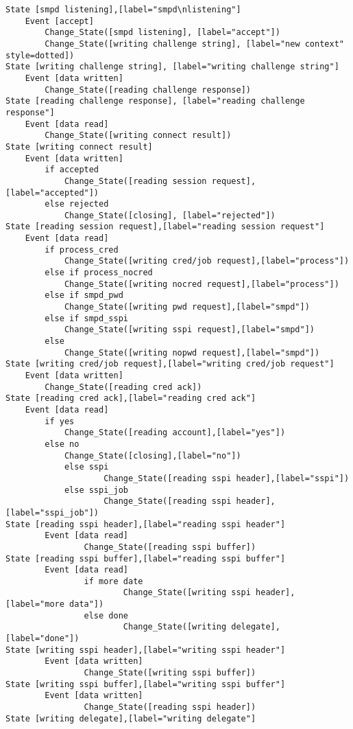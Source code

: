 \begin{comment}
This is the state machine for the smpd listener process.
Graph [smpd listener],
      [size="7.5, 10"]
\end{comment}
\begin{verbatim}
State [smpd listening],[label="smpd\nlistening"]
	Event [accept]
		Change_State([smpd listening], [label="accept"])
		Change_State([writing challenge string], [label="new context" style=dotted])
State [writing challenge string], [label="writing challenge string"]
	Event [data written]
		Change_State([reading challenge response])
State [reading challenge response], [label="reading challenge response"]
	Event [data read]
		Change_State([writing connect result])
State [writing connect result]
	Event [data written]
		if accepted
			Change_State([reading session request], [label="accepted"])
		else rejected
			Change_State([closing], [label="rejected"])
State [reading session request],[label="reading session request"]
	Event [data read]
		if process_cred
			Change_State([writing cred/job request],[label="process"])
		else if process_nocred
			Change_State([writing nocred request],[label="process"])
		else if smpd_pwd
			Change_State([writing pwd request],[label="smpd"])
		else if smpd_sspi
			Change_State([writing sspi request],[label="smpd"])
		else
			Change_State([writing nopwd request],[label="smpd"])
State [writing cred/job request],[label="writing cred/job request"]
	Event [data written]
		Change_State([reading cred ack])
State [reading cred ack],[label="reading cred ack"]
	Event [data read]
		if yes
			Change_State([reading account],[label="yes"])
		else no
			Change_State([closing],[label="no"])
	        else sspi
	                Change_State([reading sspi header],[label="sspi"])
	        else sspi_job
					Change_State([reading sspi header],[label="sspi_job"])
State [reading sspi header],[label="reading sspi header"]
        Event [data read]
                Change_State([reading sspi buffer])
State [reading sspi buffer],[label="reading sspi buffer"]
        Event [data read]
                if more date
                        Change_State([writing sspi header],[label="more data"])
                else done
                        Change_State([writing delegate],[label="done"])
State [writing sspi header],[label="writing sspi header"]
        Event [data written]
                Change_State([writing sspi buffer])
State [writing sspi buffer],[label="writing sspi buffer"]
        Event [data written]
                Change_State([reading sspi header])
State [writing delegate],[label="writing delegate"]

\end{verbatim}
